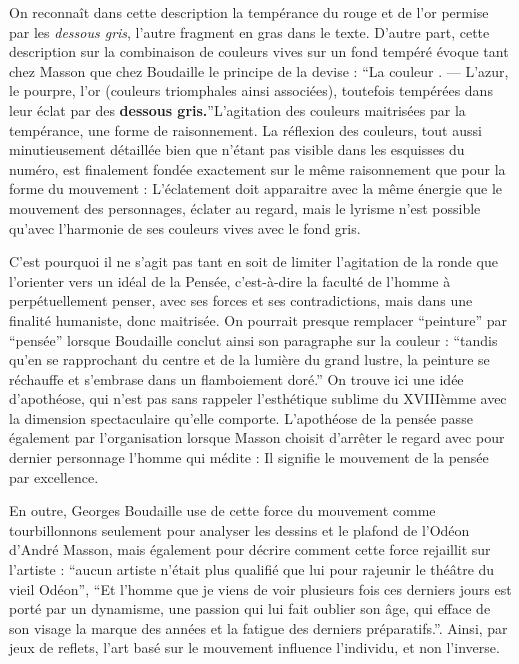 
	On reconnaît dans cette description la tempérance du rouge et de l’or permise par les \emph{dessous gris}, l’autre fragment en gras dans le texte. D’autre part, cette description sur la combinaison de couleurs vives sur un fond tempéré évoque tant chez Masson que chez Boudaille le principe de la devise : \enquote{La couleur . — L’azur, le pourpre, l’or (couleurs triomphales ainsi associées), toutefois tempérées dans leur éclat par des \textbf{dessous gris.}}L’agitation des couleurs maitrisées par la tempérance, une forme de raisonnement. La réflexion des couleurs, tout aussi minutieusement détaillée bien que n’étant pas visible dans les esquisses du numéro, est finalement fondée exactement sur le même raisonnement que pour la forme du mouvement : L’éclatement doit apparaitre avec la même énergie que le mouvement des personnages, éclater au regard, mais le lyrisme n’est possible qu’avec l’harmonie de ses couleurs vives avec le fond gris.


	C’est pourquoi il ne s’agit pas tant en soit de limiter l’agitation de la ronde que l’orienter vers un idéal de la Pensée, c’est-à-dire la faculté de l’homme à perpétuellement penser, avec ses forces et ses contradictions, mais dans une finalité humaniste, donc maitrisée. On pourrait presque remplacer \enquote{peinture} par \enquote{pensée} lorsque Boudaille conclut ainsi son paragraphe sur la couleur : \enquote{tandis qu’en se rapprochant du centre et de la lumière du grand lustre, la peinture se réchauffe et s’embrase dans un flamboiement doré.}  On trouve ici une idée d’apothéose, qui n’est pas sans rappeler l’esthétique sublime du XVIIIèmme avec la dimension spectaculaire qu’elle comporte. L’apothéose de la pensée passe également par l’organisation lorsque Masson choisit d’arrêter le regard avec pour dernier personnage l’homme qui médite : Il signifie le mouvement de la pensée par excellence. 


En outre, Georges Boudaille use de cette force du mouvement comme tourbillonnons seulement pour analyser les dessins et le plafond de l’Odéon d’André Masson, mais également pour décrire comment cette force rejaillit sur l’artiste : \enquote{aucun artiste n’était plus qualifié que lui pour rajeunir le théâtre du vieil Odéon}, \enquote{Et l’homme que je viens de voir plusieurs fois ces derniers jours est porté par un dynamisme, une passion qui lui fait oublier son âge, qui efface de son visage la marque des années et la fatigue des derniers préparatifs.}. Ainsi, par jeux de reflets, l’art basé sur le mouvement influence l’individu, et non l’inverse. 

